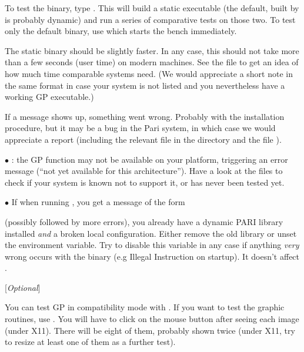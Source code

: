 
To test the binary, type . This will build a static
executable (the default, built by  is probably dynamic) and
run a series of comparative tests on those two. To test only the default
binary, use  which starts the bench immediately.

The static binary should be slightly faster. In any case, this should not
take more than a few seconds (user time) on modern machines. See the file
 to get an idea of how much time comparable systems need. (We
would appreciate a short note in the same format in case your system is not
listed and you nevertheless have a working GP executable.)

If a \kbd{[BUG]} message shows up, something went wrong. Probably with the
installation procedure, but it may be a bug in the Pari system, in which
case we would appreciate a report (including the relevant  file
in the  directory and the file ).


$\bullet$ : the GP function  may not be available on
your platform, triggering an error message (``not yet available for this
architecture''). Have a look at the  files to check if your
system is known not to support it, or has never been tested yet.

$\bullet$ If when running , you get a message of the form


\noindent (possibly followed by more errors), you already have a dynamic PARI
library installed {\it and\/} a broken local configuration. Either remove the
old library or unset the  environment variable. Try to
disable this variable in any case if anything {\it very} wrong occurs with
the  binary (e.g Illegal Instruction on startup). It doesn't
affect .

 [{\sl Optional\/}]

You can test GP in compatibility mode with . If you
want to test the graphic routines, use . You will
have to click on the mouse button after seeing each image (under X11).
There will be eight of them, probably shown twice (under X11, try to resize
at least one of them as a further test).

